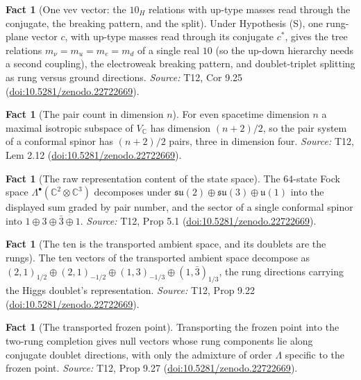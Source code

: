 \documentclass[11pt]{article}
\theoremstyle{definition}
\newtheorem{fact}[theorem]{Fact}
\theoremstyle{plain}
\providecommand{\C}{}\renewcommand{\C}{\mathbb{C}}
\providecommand{\su}{}\renewcommand{\su}{\mathfrak{su}}
\providecommand{\uu}{}\renewcommand{\uu}{\mathfrak{u}}
\begin{document}
\begin{fact}[One vev vector: the $10_{H}$ relations with up-type masses read through the conjugate, the breaking pattern, and the split]\label{c:standard-model.one-vev-vector-relations-breaking-pattern}
Under Hypothesis (S), one rung-plane vector $c$, with up-type masses read through its conjugate $c^{*}$, gives the tree relations $m_{\nu} = m_{u} = m_{e} = m_{d}$ of a single real $10$ (so the up-down hierarchy needs a second coupling), the electroweak breaking pattern, and doublet-triplet splitting as rung versus ground directions.
\emph{Source:} T12, Cor 9.25 (\href{https://doi.org/10.5281/zenodo.22722669}{doi:10.5281/zenodo.22722669}).
\end{fact}

\begin{fact}[The pair count in dimension $n$]\label{c:standard-model.pair-count-dimension}
For even spacetime dimension $n$ a maximal isotropic subspace of $V_{\C}$ has dimension $(n+2)/2$, so the pair system of a conformal spinor has $(n+2)/2$ pairs, three in dimension four.
\emph{Source:} T12, Lem 2.12 (\href{https://doi.org/10.5281/zenodo.22722669}{doi:10.5281/zenodo.22722669}).
\end{fact}

\begin{fact}[The raw representation content of the state space]\label{c:standard-model.raw-representation-content-state-space}
The $64$-state Fock space $\Lambda^{\bullet}(\C^{2} \otimes \C^{3})$ decomposes under $\su(2) \oplus \su(3) \oplus \uu(1)$ into the displayed sum graded by pair number, and the sector of a single conformal spinor into $1 \oplus 3 \oplus \bar{3} \oplus 1$.
\emph{Source:} T12, Prop 5.1 (\href{https://doi.org/10.5281/zenodo.22722669}{doi:10.5281/zenodo.22722669}).
\end{fact}

\begin{fact}[The ten is the transported ambient space, and its doublets are the rungs]\label{c:standard-model.ten-transported-ambient-space-doublets-are}
The ten vectors of the transported ambient space decompose as $(2,1)_{1/2} \oplus (2,1)_{-1/2} \oplus (1,3)_{-1/3} \oplus (1,\bar{3})_{1/3}$, the rung directions carrying the Higgs doublet's representation.
\emph{Source:} T12, Prop 9.22 (\href{https://doi.org/10.5281/zenodo.22722669}{doi:10.5281/zenodo.22722669}).
\end{fact}

\begin{fact}[The transported frozen point]\label{c:standard-model.transported-frozen-point}
Transporting the frozen point into the two-rung completion gives null vectors whose rung components lie along conjugate doublet directions, with only the admixture of order $\Lambda$ specific to the frozen point.
\emph{Source:} T12, Prop 9.27 (\href{https://doi.org/10.5281/zenodo.22722669}{doi:10.5281/zenodo.22722669}).
\end{fact}
\end{document}
